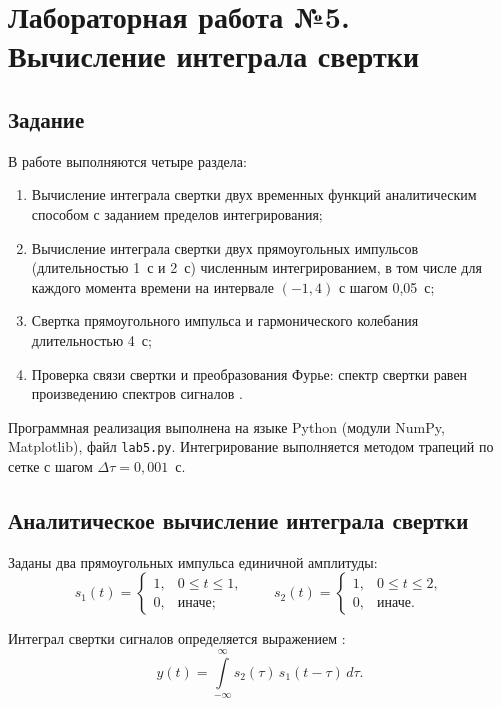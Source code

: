 \chapter{Лабораторная работа №5. Вычисление интеграла свертки}
\label{ch:lab5}

\section*{Задание}

В работе выполняются четыре раздела:
\begin{enumerate}
    \item Вычисление интеграла свертки двух временных функций аналитическим способом с заданием пределов интегрирования;
    \item Вычисление интеграла свертки двух прямоугольных импульсов (длительностью 1~с и 2~с) численным интегрированием, в том числе для каждого момента времени на интервале $(-1, 4)$ с шагом 0{,}05~с;
    \item Свертка прямоугольного импульса и гармонического колебания длительностью 4~с;
    \item Проверка связи свертки и преобразования Фурье: спектр свертки равен произведению спектров сигналов \cite{gonorovsky2006}.
\end{enumerate}

Программная реализация выполнена на языке Python (модули NumPy, Matplotlib), файл \texttt{lab5.py}. Интегрирование выполняется методом трапеций по сетке с шагом $\Delta\tau = 0{,}001$~с.

\section{Аналитическое вычисление интеграла свертки}

Заданы два прямоугольных импульса единичной амплитуды:
\begin{equation}
    s_1(t) =
    \begin{cases}
        1, & 0 \le t \le 1, \\
        0, & \text{иначе};
    \end{cases}
    \qquad
    s_2(t) =
    \begin{cases}
        1, & 0 \le t \le 2, \\
        0, & \text{иначе}.
    \end{cases}
    \label{eq:lab5:signals}
\end{equation}

Интеграл свертки сигналов определяется выражением \cite{gonorovsky2006}:
\begin{equation}
    y(t) = \int\limits_{-\infty}^{\infty} s_2(\tau)\, s_1(t - \tau)\, d\tau .
    \label{eq:lab5:conv}
\end{equation}

